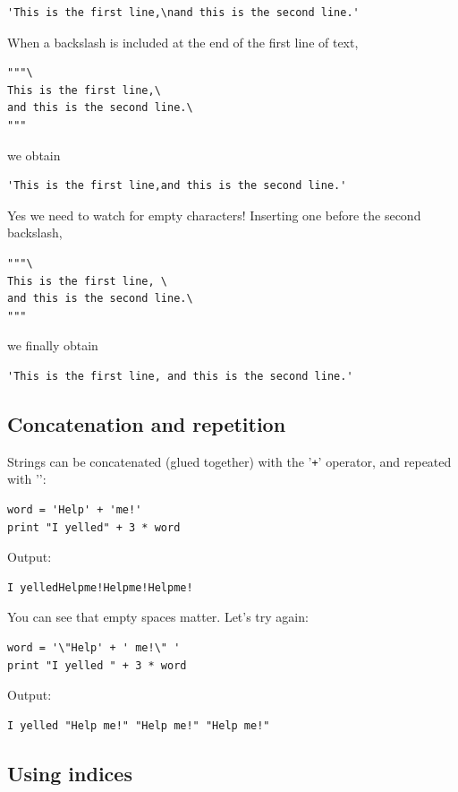 \begin{verbatim}
'This is the first line,\nand this is the second line.' 
\end{verbatim}
When a backslash is included at the end of the first line of text,

\begin{verbatim}
"""\
This is the first line,\
and this is the second line.\
""" 
\end{verbatim}
we obtain 

\begin{verbatim}
'This is the first line,and this is the second line.'
\end{verbatim}
Yes we need to watch for empty characters! Inserting one before the second 
backslash,

\begin{verbatim}
"""\
This is the first line, \
and this is the second line.\
""" 
\end{verbatim}
we finally obtain 

\begin{verbatim}
'This is the first line, and this is the second line.'
\end{verbatim}


\subsection{Concatenation and repetition}

Strings can be concatenated (glued together) with the '{\tt +}' operator, and repeated with '{\tt *}':

\begin{verbatim}
word = 'Help' + 'me!'
print "I yelled" + 3 * word
\end{verbatim}
Output:

\begin{verbatim}
I yelledHelpme!Helpme!Helpme!
\end{verbatim}
You can see that empty spaces matter. Let's try again:

\begin{verbatim}
word = '\"Help' + ' me!\" '
print "I yelled " + 3 * word
\end{verbatim}
Output:

\begin{verbatim}
I yelled "Help me!" "Help me!" "Help me!"
\end{verbatim}

\subsection{Using indices}

